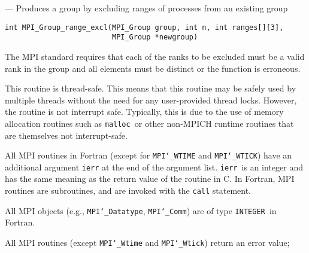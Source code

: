 \startmanpage
{}
--- Produces a group by excluding ranges of processes from an existing group 
\startvb\begin{verbatim}
int MPI_Group_range_excl(MPI_Group group, int n, int ranges[][3], 
                         MPI_Group *newgroup)

\end{verbatim}
\endvb

\par
{}
\par
{}
The MPI standard requires that each of the ranks to be excluded must be
a valid rank in the group and all elements must be distinct or the
function is erroneous.
\par
{}
\par
This routine is thread-safe.  This means that this routine may be
safely used by multiple threads without the need for any user-provided
thread locks.  However, the routine is not interrupt safe.  Typically,
this is due to the use of memory allocation routines such as {\tt malloc
}or other non-MPICH runtime routines that are themselves not interrupt-safe.
\par
{}
All MPI routines in Fortran (except for {\tt MPI{\tt \char`\_}WTIME} and {\tt MPI{\tt \char`\_}WTICK}) have
an additional argument {\tt ierr} at the end of the argument list.  {\tt ierr
}is an integer and has the same meaning as the return value of the routine
in C.  In Fortran, MPI routines are subroutines, and are invoked with the
{\tt call} statement.
\par
All MPI objects (e.g., {\tt MPI{\tt \char`\_}Datatype}, {\tt MPI{\tt \char`\_}Comm}) are of type {\tt INTEGER
}in Fortran.
\par
{}
\par
All MPI routines (except {\tt MPI{\tt \char`\_}Wtime} and {\tt MPI{\tt \char`\_}Wtick}) return an error value;
